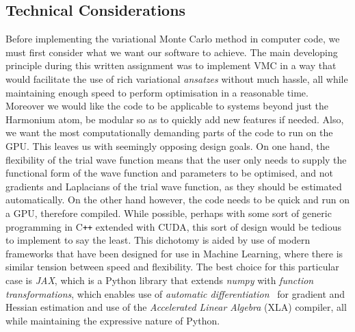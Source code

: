\documentclass[final,3p,times,twocolumn]{elsarticle}
\begin{document}
	\subsection{Technical Considerations}
	Before implementing the variational Monte Carlo method in computer code, we must first consider what we want our software to achieve. The main developing principle during this written assignment was to implement VMC in a way that would facilitate the use of rich variational \emph{ansatzes} without much hassle, all while maintaining enough speed to perform optimisation in a reasonable time. Moreover we would like the code to be applicable to systems beyond just the Harmonium atom, be modular so as to quickly add new features if needed. Also, we want the most computationally demanding parts of the code to run on the GPU. This leaves us with seemingly opposing design goals. On one hand, the flexibility of the trial wave function means that the user only needs to supply the functional form of the wave function and parameters to be optimised, and not gradients and Laplacians of the trial wave function, as they should be estimated automatically. On the other hand however, the code needs to be quick and run on a GPU, therefore compiled. While possible, perhaps with some sort of generic programming in C\texttt{++} extended with CUDA, this sort of design would be tedious to implement to say the least. This dichotomy is aided by use of modern frameworks that have been designed for use in Machine Learning, where there is similar tension between speed and flexibility. The best choice for this particular case is \emph{JAX}, which is a Python library that extends \emph{numpy} with \emph{function transformations}, which enables use of \emph{automatic differentiation}~\cite{baydin2018automatic} for gradient and Hessian estimation and use of the \emph{Accelerated Linear Algebra} (XLA) compiler, all while maintaining the expressive nature of Python. 
	
\end{document}
